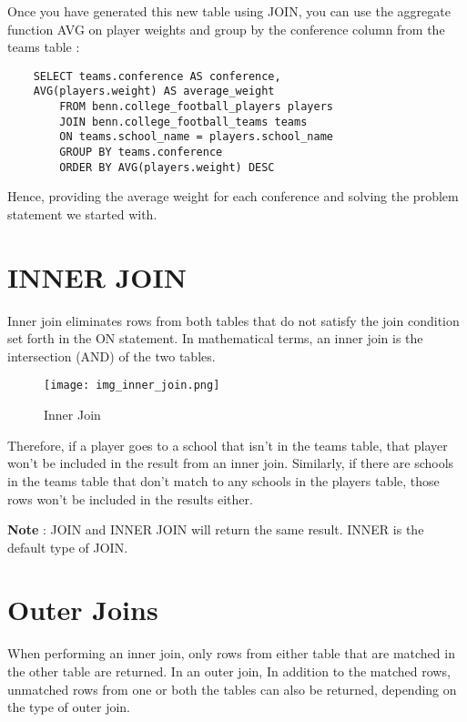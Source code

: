 \documentclass[12pt, letterpaper]{article}
\begin{document}
Once you have generated this new table using JOIN, you can use the aggregate function AVG on player weights and group by the conference column from the teams table :  

\begin{verbatim}
    SELECT teams.conference AS conference, 
    AVG(players.weight) AS average_weight
        FROM benn.college_football_players players
        JOIN benn.college_football_teams teams
        ON teams.school_name = players.school_name
        GROUP BY teams.conference
        ORDER BY AVG(players.weight) DESC
\end{verbatim}

Hence, providing the average weight for each conference and solving the problem statement we started with.


\section{INNER JOIN}
Inner join eliminates rows from both tables that do not satisfy the join condition set forth in the ON statement. In mathematical terms, an inner join is the intersection (AND) of the two tables.

\begin{figure}[H]
    \centering
    \texttt{[image: img\_inner\_join.png]}
    \caption{Inner Join}
    \label{innerjoin}
\end{figure}

Therefore, if a player goes to a school that isn't in the teams table, that player won't be included in the result from an inner join. Similarly, if there are schools in the teams table that don't match to any schools in the players table, those rows won't be included in the results either.

\begin{displayquote}
    \textbf{Note} : JOIN and INNER JOIN will return the same result. INNER is the default type of JOIN.
\end{displayquote}


\section{Outer Joins}
When performing an inner join, only rows from either table that are matched in the other table are returned. In an outer join, In addition to the matched rows, unmatched rows from one or both the tables can also be returned, depending on the type of outer join.
\end{document}
